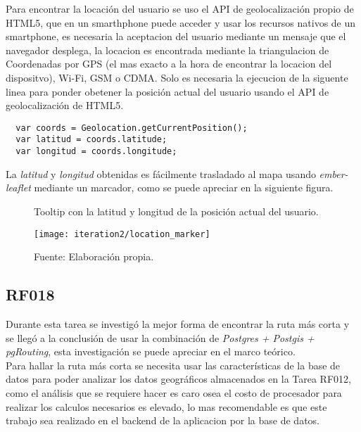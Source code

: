 Para encontrar la locación del usuario se uso el API de geolocalización propio de HTML5, que en un smarthphone puede acceder y usar los recursos nativos de un smartphone, es necesaria la aceptacion del usuario mediante un mensaje que el navegador desplega, la locacion es encontrada mediante la triangulacion de Coordenadas por GPS (el mas exacto a la hora de encontrar la locacion del dispositvo), Wi-Fi, GSM o CDMA. Solo es necesaria la ejecucion de la siguente linea para ponder obetener la posición actual del usuario usando el API de geolocalización de HTML5.

\begin{verbatim}
  var coords = Geolocation.getCurrentPosition();
  var latitud = coords.latitude;
  var longitud = coords.longitude;
\end{verbatim}

La \emph{latitud} y \emph{longitud} obtenidas es fácilmente trasladado al mapa usando \emph{ember-leaflet} mediante un marcador, como se puede apreciar en la siguiente figura.

\begin{figure}[H]
  \begin{center}
    \caption{Tooltip con la latitud y longitud de la posición actual del usuario.}
    \label{fig:location_marker}
    \texttt{[image: iteration2/location\_marker]}
    \caption*{Fuente: Elaboración propia.}
  \end{center}
\end{figure}

\subsection{RF018}
\label{sub:RF018}

Durante esta tarea se investigó la mejor forma de encontrar la ruta más corta y se llegó a la conclusión de usar la combinación de \emph{Postgres + Postgis + pgRouting}, esta investigación se puede apreciar en el marco teórico.\\

Para hallar la ruta más corta se necesita usar las características de la base de datos para poder analizar los datos geográficos almacenados en la Tarea RF012, como el análisis que se requiere hacer es caro osea el costo de procesador para realizar los calculos necesarios es elevado, lo mas recomendable es que este trabajo sea realizado en el backend de la aplicacion por la base de datos.\\

